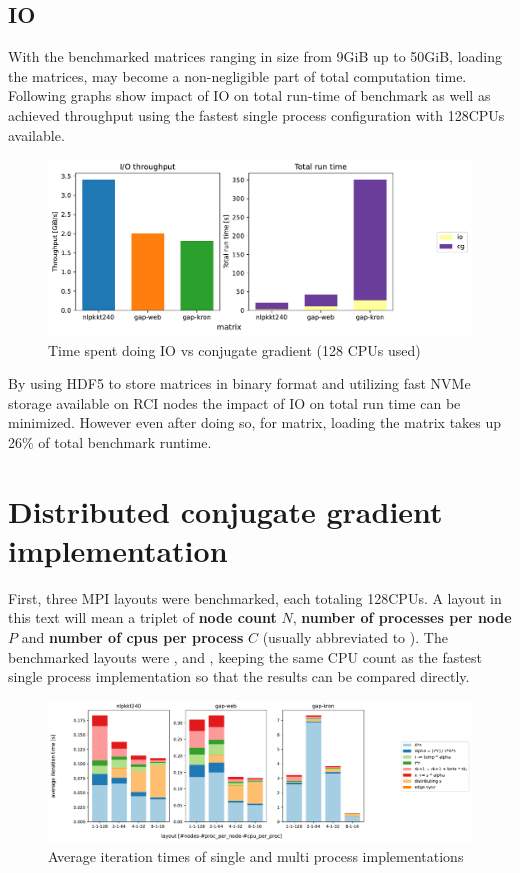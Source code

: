 \documentclass[thesis=M,english]{FITthesis}[2019/12/23]
\begin{document}
\subsection{IO}

With the benchmarked matrices ranging in size from 9GiB up to 50GiB, loading the matrices,
may become a non-negligible part of total computation time. Following graphs show impact of
IO on total run-time of benchmark as well as achieved throughput using the fastest single process
configuration with 128CPUs available.

\begin{figure}[htp]
    \centering
    \includegraphics[scale=0.5]{static/io_sp.pdf}
    \caption{Time spent doing IO vs conjugate gradient (128 CPUs used)}
\end{figure}

By using HDF5 to store matrices in binary format and utilizing fast NVMe storage available
on RCI nodes the impact of IO on total run time can be minimized. However even after doing so,
for  matrix, loading the matrix takes up 26\% of total benchmark runtime.

\pagebreak

\section{Distributed conjugate gradient implementation}

First, three MPI layouts were benchmarked, each totaling 128CPUs. A layout
in this text will mean a triplet of \textbf{node count} $N$,
\textbf{number of processes per node} $P$
and \textbf{number of cpus per process} $C$ (usually abbreviated to ).
The benchmarked layouts were ,  and , keeping
the same CPU count as the fastest single process implementation so that the results
can be compared directly.

\begin{figure}[htp]
    \centering
    \includegraphics[scale=0.35]{static/mpi.pdf}
    \caption{Average iteration times of single and multi process implementations}
\end{figure}
\end{document}
